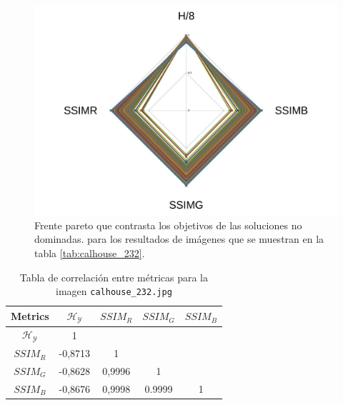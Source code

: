     \begin{figure}[H]
    \centering
    \includegraphics[width=\textwidth]{./Figures/calhouse_232/calhouse_0232_2.jpg}
    \caption{Frente pareto que contrasta los objetivos de las soluciones no dominadas. para los resultados de imágenes que se muestran en la tabla \ref{tab:calhouse_232}.}
    \label{fig:calhouse2332fp}
    \end{figure}

\begin{table}[H]
\setlength{\abovecaptionskip}{2pt plus 3pt minus 2pt} %
\caption[Parámetros de entrada para $MOPSO$]{Tabla de correlación entre métricas para la imagen \texttt{calhouse\_232.jpg}}
\begin{center}
 \begin{tabular}{||c | c c c c||} 
 \hline
Metrics & $\mathscr{H_Y}$ & $SSIM_R$ & $SSIM_G$ & $SSIM_B$ \\ 
\hline
$\mathscr{H_Y}$ & 1 &  &  & \\ 
\hline
$SSIM_R$ & -0,8713 & 1 &  \\ 
\hline
$SSIM_G$ & -0,8628 & 0,9996  & 1  & \\ 
\hline
$SSIM_B$ & -0,8676 & 0,9998  & 0.9999  & 1 \\ 
\hline
\end{tabular}
\end{center}
\label{table:correlacion232}
\end{table}


